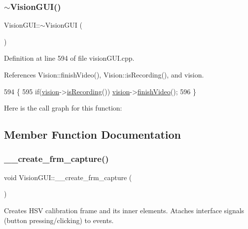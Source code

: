 \subsubsection{\texorpdfstring{$\sim$\+Vision\+G\+U\+I()}{~VisionGUI()}}
{\footnotesize\ttfamily Vision\+G\+U\+I\+::$\sim$\+Vision\+G\+UI (\begin{DoxyParamCaption}{ }\end{DoxyParamCaption})}



Definition at line 594 of file vision\+G\+U\+I.\+cpp.



References Vision\+::finish\+Video(), Vision\+::is\+Recording(), and vision.


\begin{DoxyCode}
594                       \{
595     \textcolor{keywordflow}{if}(\hyperlink{class_vision_g_u_i_a36aba058af844ec6cbe0c945c616cd5f}{vision}->\hyperlink{class_vision_a7990c9cb8684e1d1c92a5b6aa99abe6f}{isRecording}()) \hyperlink{class_vision_g_u_i_a36aba058af844ec6cbe0c945c616cd5f}{vision}->\hyperlink{class_vision_a5c7366071fde8a1b916be0721adaa275}{finishVideo}();
596 \}
\end{DoxyCode}
Here is the call graph for this function\+:


\subsection{Member Function Documentation}
\mbox{\label{class_vision_g_u_i_a9b0cac7f32fc402ce5aaff0325e39b77}} 
\subsubsection{\texorpdfstring{\+\_\+\+\_\+create\+\_\+frm\+\_\+capture()}{\_\_create\_frm\_capture()}}
{\footnotesize\ttfamily void Vision\+G\+U\+I\+::\+\_\+\+\_\+create\+\_\+frm\+\_\+capture (\begin{DoxyParamCaption}{ }\end{DoxyParamCaption})\hspace{0.3cm}{\ttfamily [private]}}



Creates H\+SV calibration frame and its inner elements. Ataches interface signals (button pressing/clicking) to events. 



